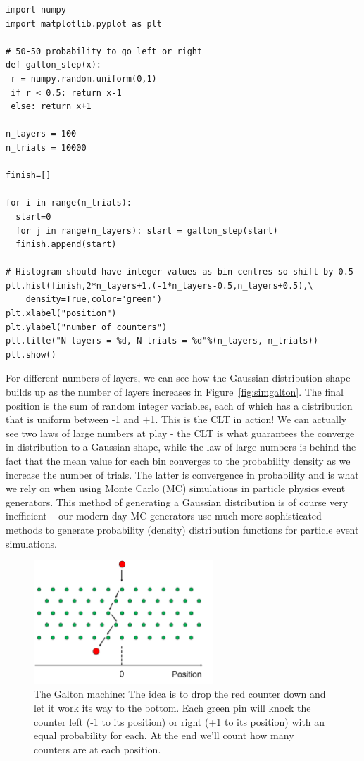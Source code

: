 \begin{lstlisting}[style = Python]
import numpy
import matplotlib.pyplot as plt

# 50-50 probability to go left or right
def galton_step(x):
 r = numpy.random.uniform(0,1)
 if r < 0.5: return x-1
 else: return x+1

n_layers = 100
n_trials = 10000

finish=[]

for i in range(n_trials):
  start=0
  for j in range(n_layers): start = galton_step(start)
  finish.append(start)

# Histogram should have integer values as bin centres so shift by 0.5
plt.hist(finish,2*n_layers+1,(-1*n_layers-0.5,n_layers+0.5),\
    density=True,color='green')
plt.xlabel("position")
plt.ylabel("number of counters")
plt.title("N layers = %d, N trials = %d"%(n_layers, n_trials))
plt.show()
\end{lstlisting}
For different numbers of layers, we can see how the Gaussian distribution shape builds up as the number of layers increases in Figure~\ref{fig:simgalton}. The final position is the sum of random integer variables, each of which has a distribution that is uniform between -1 and +1. This is the CLT in action! We can actually see two laws of large numbers at play - the CLT is what guarantees the converge in distribution to a Gaussian shape, while the law of large numbers is behind the fact that the mean value for each bin converges to the probability density as we increase the number of trials. The latter is convergence in probability and is what we rely on when using Monte Carlo (MC) simulations in particle physics event generators. This method of generating a Gaussian distribution is of course very inefficient -- our modern day MC generators use much more sophisticated methods to generate probability (density) distribution functions for particle event simulations.  
\begin{figure}[hbt!]
    \centering
    \includegraphics[width=0.6\textwidth]{figures/Probability/galton_image.pdf}
    \caption{The Galton machine: The idea is to drop the red counter down and let it work its way to the bottom. Each green pin will knock the counter left (-1 to its position) or right (+1 to its position) with an equal probability for each. At the end we'll count how many counters are at each position.}
    \label{fig:galton}
\end{figure}

